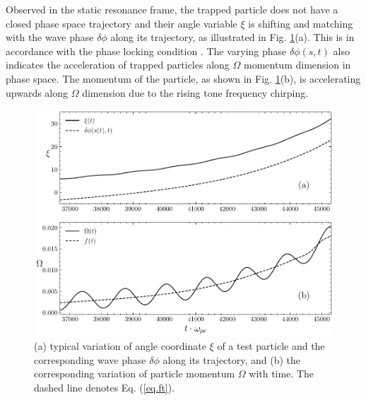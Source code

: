 Observed in the static resonance frame, the trapped particle does not have a closed phase space trajectory and their angle variable $\xi$ is shifting and matching with the wave phase $\delta \phi$ along its trajectory, as illustrated in Fig. \ref{fig.phaseflow}(a). This is in accordance with the phase locking condition \cite{tao_trap-release-amplify_2021}.
The varying phase $\delta \phi(s,t)$ also indicates the acceleration of trapped particles along $\Omega$ momentum dimension in phase space.
The momentum of the particle, as shown in Fig. \ref{fig.phaseflow}(b), is accelerating upwards along $\Omega$ dimension due to the rising tone frequency chirping.

\begin{figure}
    \centering
    \includegraphics[scale=0.5]{img/phaseflow.pdf}
    \caption{
    (a) typical variation of angle coordinate $\xi$ of a test particle and the corresponding wave phase $\delta \phi$ along its trajectory, and (b) the corresponding variation of particle momentum $\Omega$ with time. The dashed line denotes Eq. (\ref{eq.ft}).
    \label{fig.phaseflow}
    }
\end{figure}

